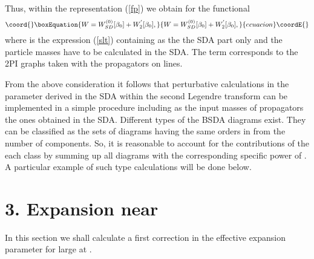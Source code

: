 \documentclass[a4paper,12pt]{article}
\begin{document}
Thus, within the representation (\ref{fp}) we obtain for the \coordHE{}
functional
\begin{equation}\coord{}\boxEquation{ \label{slt1}
W = W_{SD}^{(0)}[\beta_0] + W_2^{'}[\beta_0],
}{ W = W_{SD}^{(0)}[\beta_0] + W_2^{'}[\beta_0],
}{ecuacion}\coordE{}\end{equation}
where \coordHE{} is the expression (\ref{slt})
containing as the \coordHE{} the SDA part only and the particle
masses have to be calculated in the SDA. The term \coordHE{}
corresponds to the 2PI graphs taken with the \coordHE{} propagators on
lines.


From the above consideration it follows that perturbative calculations
in the parameter \myHighlight{$\epsilon$}\coordHE{} derived in the SDA within the second
Legendre transform can be implemented in a simple procedure including
as the input masses of propagators \myHighlight{$\beta$}\coordHE{} the ones obtained in the
SDA. Different types of the BSDA diagrams exist.  They can be
classified as the sets of diagrams having the same orders in
\coordHE{} from the number of components. So, it is reasonable to
account for the contributions of the each class by summing up all
diagrams with the corresponding specific power of \coordHE{}. A
particular example of such type calculations will be done below.

\section*{3. Expansion near \coordHE{}}
In this section we shall calculate a first correction in the effective
expansion parameter \coordHE{} for large \coordHE{} at \coordHE{}.
\end{document}
